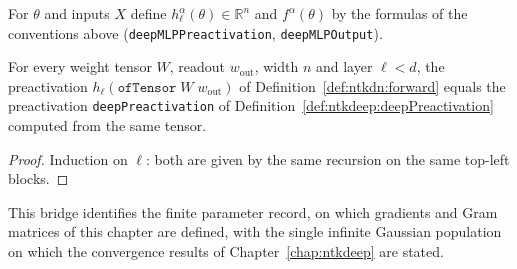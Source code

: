 \begin{definition}\label{def:ntkdn:forward}
  \leanok
For $\theta$ and inputs $X$ define $h_\ell^\alpha(\theta)\in\mathbb R^n$ and $f^\alpha(\theta)$ by the formulas of the conventions above (\texttt{deepMLPPreactivation}, \texttt{deepMLPOutput}).
\end{definition}

\begin{theorem}\label{thm:ntkdn:bridge}
  \leanok
For every weight tensor $W$, readout $w_{\mathrm{out}}$, width $n$ and layer $\ell<d$, the preactivation $h_\ell(\texttt{ofTensor}\;W\;w_{\mathrm{out}})$ of Definition~\ref{def:ntkdn:forward} equals the preactivation \texttt{deepPreactivation} of Definition~\ref{def:ntkdeep:deepPreactivation} computed from the same tensor.
\end{theorem}

\begin{proof}
  \leanok
Induction on $\ell$: both are given by the same recursion on the same top-left blocks.
\end{proof}

This bridge identifies the finite parameter record, on which gradients and Gram matrices of this chapter are defined, with the single infinite Gaussian population on which the convergence results of Chapter~\ref{chap:ntkdeep} are stated.


